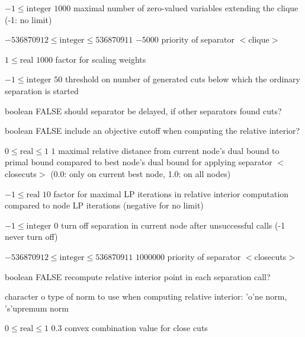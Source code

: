 %
{$-1\leq\textrm{integer}$}%
{$1000$}%
{maximal number of zero-valued variables extending the clique (-1: no limit)}%
{}

%
{$-536870912\leq\textrm{integer}\leq536870911$}%
{$-5000$}%
{priority of separator $<$clique$>$}%
{}

%
{$1\leq\textrm{real}$}%
{$1000$}%
{factor for scaling weights}%
{}

%
{$-1\leq\textrm{integer}$}%
{$50$}%
{threshold on number of generated cuts below which the ordinary separation is started}%
{}

%
{boolean}%
{FALSE}%
{should separator be delayed, if other separators found cuts?}%
{}

%
{boolean}%
{FALSE}%
{include an objective cutoff when computing the relative interior?}%
{}

%
{$0\leq\textrm{real}\leq1$}%
{$1$}%
{maximal relative distance from current node's dual bound to primal bound compared to best node's dual bound for applying separator $<$closecuts$>$ (0.0: only on current best node, 1.0: on all nodes)}%
{}

%
{$-1\leq\textrm{real}$}%
{$10$}%
{factor for maximal LP iterations in relative interior computation compared to node LP iterations (negative for no limit)}%
{}

%
{$-1\leq\textrm{integer}$}%
{$0$}%
{turn off separation in current node after unsuccessful calls (-1 never turn off)}%
{}

%
{$-536870912\leq\textrm{integer}\leq536870911$}%
{$1000000$}%
{priority of separator $<$closecuts$>$}%
{}

%
{boolean}%
{FALSE}%
{recompute relative interior point in each separation call?}%
{}

%
{character}%
{o}%
{type of norm to use when computing relative interior: 'o'ne norm, 's'upremum norm}%
{}

%
{$0\leq\textrm{real}\leq1$}%
{$0.3$}%
{convex combination value for close cuts}%
{}

